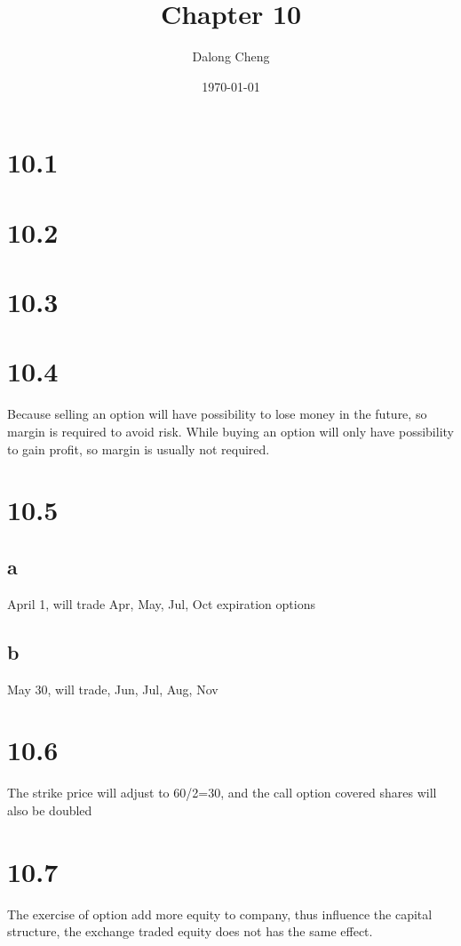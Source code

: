\documentclass[12pt]{article}%
\begin{document}
\title{Chapter 10}
\author{Dalong Cheng}
\date{\today}
\maketitle
\section*{10.1}

\section*{10.2}

\section*{10.3}

\section*{10.4}
Because selling an option will have possibility to lose money in the future,
so margin is required to avoid risk. While buying an option will only have 
possibility to gain profit, so margin is usually not required.

\section*{10.5}
  \subsection{a}
  April 1, will trade Apr, May, Jul, Oct expiration options

  \subsection{b}
  May 30, will trade, Jun, Jul, Aug, Nov

\section*{10.6}
The strike price will adjust to 60/2=30, and the call option 
covered shares will also be doubled

\section*{10.7}
The exercise of option add more equity to company, thus 
influence the capital structure, the exchange traded equity does not has the same effect.
\end{document}
